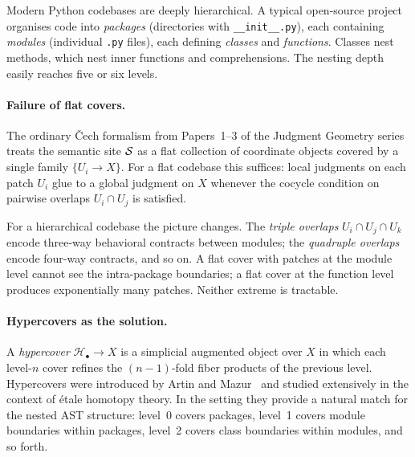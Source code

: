 \documentclass[11pt]{article}
\newcommand{\HC}{\mathcal{H}}              %
\begin{document}
Modern Python codebases are deeply hierarchical.  A typical open-source
project organises code into \emph{packages} (directories with
\texttt{\_\_init\_\_.py}), each containing \emph{modules} (individual
\texttt{.py} files), each defining \emph{classes} and \emph{functions}.
Classes nest methods, which nest inner functions and comprehensions.
The nesting depth easily reaches five or six levels.

\paragraph{Failure of flat covers.}
The ordinary Čech formalism from Papers~1--3 of the Judgment Geometry
series treats the semantic site $\mathcal{S}$ as a flat collection of
coordinate objects covered by a single family $\{U_i \to X\}$.
For a flat codebase this suffices: local judgments on each patch
$U_i$ glue to a global judgment on $X$ whenever the cocycle condition
on pairwise overlaps $U_i \cap U_j$ is satisfied.

For a hierarchical codebase the picture changes.  The \emph{triple
overlaps} $U_i \cap U_j \cap U_k$ encode three-way behavioral
contracts between modules; the \emph{quadruple overlaps} encode
four-way contracts, and so on.  A flat cover with patches at the module
level cannot see the intra-package boundaries; a flat cover at the
function level produces exponentially many patches.  Neither extreme is
tractable.

\paragraph{Hypercovers as the solution.}
A \emph{hypercover} $\HC_\bullet \to X$ is a simplicial augmented
object over $X$ in which each level-$n$ cover refines the $(n{-}1)$-fold
fiber products of the previous level.  Hypercovers were introduced by
Artin and Mazur~\cite{artinmazur1969} and studied extensively in the
context of étale homotopy theory.  In the \JuGeo{} setting they
provide a natural match for the nested AST structure: level~0 covers
packages, level~1 covers module boundaries within packages, level~2
covers class boundaries within modules, and so forth.
\end{document}
